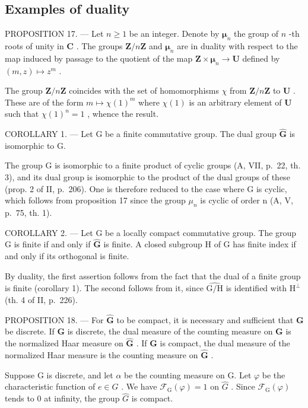 \subsection{Examples of duality}

PROPOSITION 17. --- Let \(n \geqslant 1\) be an integer. Denote by \(\boldsymbol{\mu}_{n}\) the group of \(n\) -th roots of unity in \(\mathbf{C}\) . The groups \(\mathbf{Z}/n\mathbf{Z}\) and \(\boldsymbol{\mu}_{n}\) are in duality with respect to the map induced by passage to the quotient of the map \(\mathbf{Z} \times \boldsymbol{\mu}_{n} \to \mathbf{U}\) defined by \((m,z) \mapsto z^{m}\) .

The group \(\mathbf{Z}/n\mathbf{Z}\) coincides with the set of homomorphisms \(\chi\) from \(\mathbf{Z}/n\mathbf{Z}\) to \(\mathbf{U}\) . These are of the form \(m \mapsto \chi(1)^m\) where \(\chi(1)\) is an arbitrary element of \(\mathbf{U}\) such that \(\chi(1)^n = 1\) , whence the result.

COROLLARY 1. --- Let G be a finite commutative group. The dual group \(\widehat{\mathbf{G}}\) is isomorphic to G.

The group G is isomorphic to a finite product of cyclic groups (A, VII, p.~22, th. 3), and its dual group is isomorphic to the product of the dual groups of these (prop. 2 of II, p.~206). One is therefore reduced to the case where G is cyclic, which follows from proposition 17 since the group \(\mu_{n}\) is cyclic of order n (A, V, p.~75, th. 1).

COROLLARY 2. --- Let G be a locally compact commutative group. The group G is finite if and only if \(\widehat{\mathbf{G}}\) is finite. A closed subgroup H of G has finite index if and only if its orthogonal is finite.

By duality, the first assertion follows from the fact that the dual of a finite group is finite (corollary 1). The second follows from it, since \(\widehat{\mathrm{G / H}}\) is identified with \(\mathrm{H}^{\perp}\) (th. 4 of II, p.~226).

PROPOSITION 18. --- For \(\widehat{\mathbf{G}}\) to be compact, it is necessary and sufficient that \(\mathbf{G}\) be discrete. If \(\mathbf{G}\) is discrete, the dual measure of the counting measure on \(\mathbf{G}\) is the normalized Haar measure on \(\widehat{\mathbf{G}}\) . If \(\mathbf{G}\) is compact, the dual measure of the normalized Haar measure is the counting measure on \(\widehat{\mathbf{G}}\) .

Suppose G is discrete, and let \(\alpha\) be the counting measure on G. Let \(\varphi\) be the characteristic function of \(e \in G\) . We have \(\mathcal{F}_{\mathrm{G}}(\varphi) = 1\) on \(\widehat{G}\) . Since \(\mathcal{F}_{\mathrm{G}}(\varphi)\) tends to 0 at infinity, the group \(\widehat{G}\) is compact.

